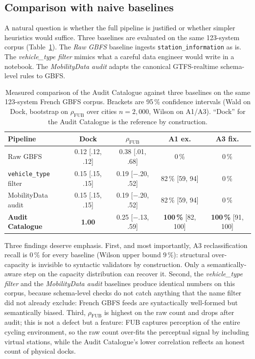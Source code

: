 \documentclass[11pt,a4paper]{article}
\begin{document}
\subsection{Comparison with naive baselines}
A natural question is whether the full pipeline is justified or whether
simpler heuristics would suffice. Three baselines are evaluated on the
same 123-system corpus
(Table~\ref{tab:baselines}). The \emph{Raw GBFS} baseline ingests
\texttt{station\_information} as is. The \emph{vehicle\_type filter}
mimics what a careful data engineer would write in a notebook. The
\emph{MobilityData audit} adapts the canonical GTFS-realtime
schema-level rules to GBFS.

\begin{table}[ht]
\centering
\caption{Measured comparison of the Audit Catalogue against three
baselines on the same 123-system French GBFS corpus. Brackets are
95\,\% confidence intervals (Wald on Dock, bootstrap on
$\rho_{\text{FUB}}$ over cities $n=2{,}000$, Wilson on A1/A3). ``Dock''
for the Audit Catalogue is the reference by construction.}
\label{tab:baselines}
\small
\begin{tabular}{@{}lcccc@{}}
\toprule
\textbf{Pipeline} & \textbf{Dock} & \textbf{$\rho_{\text{FUB}}$} &
\textbf{A1 ex.} & \textbf{A3 fix.}\\
\midrule
Raw GBFS &
  0.12 \footnotesize[.12, .12] &
  0.38 \footnotesize[.01, .68] &
  0\,\% & 0\,\% \\
\texttt{vehicle\_type} filter &
  0.15 \footnotesize[.15, .15] &
  0.19 \footnotesize[$-$.20, .52] &
  82\,\% \footnotesize[59, 94] & 0\,\% \\
MobilityData audit &
  0.15 \footnotesize[.15, .15] &
  0.19 \footnotesize[$-$.20, .52] &
  82\,\% \footnotesize[59, 94] & 0\,\% \\
\textbf{Audit Catalogue} &
  \textbf{1.00} &
  0.25 \footnotesize[$-$.13, .59] &
  \textbf{100\,\%} \footnotesize[82, 100] &
  \textbf{100\,\%} \footnotesize[91, 100] \\
\bottomrule
\end{tabular}
\end{table}

Three findings deserve emphasis. First, and most importantly, A3
reclassification recall is $0\,\%$ for every baseline (Wilson upper
bound $9\,\%$): structural over-capacity is invisible to syntactic
validators by construction. Only a semantically-aware step on the
capacity distribution can recover it. Second, the
\emph{vehicle\_type filter} and the \emph{MobilityData audit} baselines
produce identical numbers on this corpus, because schema-level checks
do not catch anything that the name filter did not already exclude:
French GBFS feeds are syntactically well-formed but semantically
biased. Third, $\rho_{\text{FUB}}$ is highest on the raw count and
drops after audit; this is not a defect but a feature: FUB captures
perception of the entire cycling environment, so the raw count
over-fits the perceptual signal by including virtual stations, while
the Audit Catalogue's lower correlation reflects an honest count of
physical docks.
\end{document}
